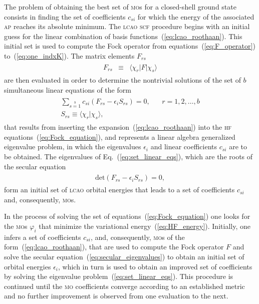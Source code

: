 The problem of obtaining the best set of \textsc{mo}s for a
closed-shell ground state consists in finding the set of coefficients
$c_{si}$ for which the energy of the associated \textsc{ap} reaches
its absolute minimum. The \textsc{lcao} \textsc{scf} procedure begins
with an initial guess for the linear combination of basis
functions~(\ref{eq:lcao_roothaan}). This initial set is used to
compute the Fock operator from equations~(\ref{eq:F_operator})
to~(\ref{eq:one_indxK}). The matrix elements $F_{rs}$
%
\begin{eqnarray}
  \begin{split}
    F_{rs} & \equiv & \langle \chi_{r} | F | \chi_{s} \rangle
  \end{split}
  \label{eq:F_matrix}
\end{eqnarray}
%
are then evaluated in order to determine the nontrivial solutions of
the set of $b$ simultaneous linear equations of the form
%
\begin{eqnarray}
  \begin{split}
    \sum\limits_{s=1}\limits^{b} c_{si} (F_{rs} - \epsilon_{i}S_{rs}) = 0, &
    ~~~~ r = 1,2,\dots,b \\
    S_{rs} \equiv \langle \chi_{r} | \chi_{s} \rangle,~~~~~~~~~~~~
  \end{split}
  \label{eq:set_linear_eqs}
\end{eqnarray}
%
that results from inserting the expansion~(\ref{eq:lcao_roothaan})
into the \textsc{hf} equations~(\ref{eq:Fock_equation}), and
represents a linear algebra generalized eigenvalue problem, in which
the eigenvalues $\epsilon_{i}$ and linear coefficients $c_{si}$ are to
be obtained. The eigenvalues of Eq.~(\ref{eq:set_linear_eqs}), which
are the roots of the secular equation~\cite{Roothaan_HF,Levine_QChem}
%
\begin{eqnarray}
  \begin{split}
    \mathrm{det} (F_{rs} - \epsilon_{i}S_{rs}) = 0,
  \end{split}
  \label{eq:secular_eigenvalues}
\end{eqnarray}
%
form an initial set of \textsc{lcao} orbital energies that leads to a
set of coefficients $c_{si}$ and, consequently, \textsc{mo}s.

In the process of solving the set of
equations~(\ref{eq:Fock_equation}) one looks for the \textsc{mo}s
$\varphi_{i}$ that minimize the variational
energy~(\ref{eq:HF_energy}). Initially, one infers a set of
coefficients $c_{si}$, and, consequently, \textsc{mo}s of the
form~(\ref{eq:lcao_roothaan}), that are used to compute the Fock
operator $F$ and solve the secular
equation~(\ref{eq:secular_eigenvalues}) to obtain an initial set of
orbital energies $\epsilon_{i}$, which in turn is used to obtain an
improved set of coefficients by solving the eigenvalue
problem~(\ref{eq:set_linear_eqs}). This procedure is continued until
the \textsc{mo} coefficients converge according to an established
metric and no further improvement is observed from one evaluation to
the next.

